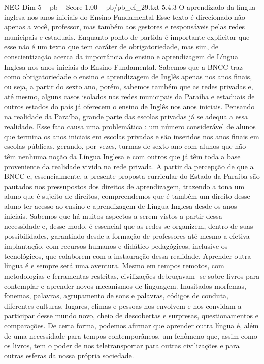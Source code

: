 \begin{textsample}{NEG Dim 5 – pb – Score 1.00 – pb/pb\_ef\_29.txt}  \label{ex:f5_neg_199}
5.4.3 O aprendizado da língua inglesa nos anos iniciais do Ensino Fundamental Esse texto é direcionado não apenas a você, professor, mas também aos gestores e responsáveis pelas redes municipais e estaduais.
Enquanto ponto de partida é importante explicitar que esse não é um texto que tem caráter de obrigatoriedade, mas sim, de conscientização acerca da importância do ensino e aprendizagem de Língua Inglesa nos anos iniciais do Ensino Fundamental.
Sabemos que a BNCC traz como obrigatoriedade o ensino e aprendizagem de Inglês apenas nos anos finais, ou seja, a partir do sexto ano, porém, sabemos também que as redes privadas e, até mesmo, alguns casos isolados nas redes municipais da Paraíba e estaduais de outros estados do país já oferecem o ensino de Inglês nos anos iniciais.
Pensando na realidade da Paraíba, grande parte das escolas privadas já se adequa a essa realidade.
Esse fato causa uma problemática : um número considerável de alunos que termina os anos iniciais em escolas privadas e são inseridos nos anos finais em escolas públicas, gerando, por vezes, turmas de sexto ano com alunos que não têm nenhuma noção da Língua Inglesa e com outros que já têm toda a base proveniente da realidade vivida na rede privada.
A partir da percepção de que a BNCC e, essencialmente, a presente proposta curricular do Estado da Paraíba são pautados nos pressupostos dos direitos de aprendizagem, trazendo a tona um aluno que é sujeito de direitos, compreendemos que é também um direito desse aluno ter acesso ao ensino e aprendizagem de Língua Inglesa desde os anos iniciais.
Sabemos que há muitos aspectos a serem vistos a partir dessa necessidade e, desse modo, é essencial que as redes se organizem, dentro de suas possibilidades, garantindo desde a formação de professores até mesmo a efetiva implantação, com recursos humanos e didático-pedagógicos, inclusive os tecnológicos, que colaborem com a instauração dessa realidade.
Aprender outra língua é e sempre será uma aventura.
Mesmo em tempos remotos, com metodologias e ferramentas restritas, civilizações debruçavam -se sobre livros para contemplar e aprender novos mecanismos de linguagem.
Inusitados morfemas, fonemas, palavras, agrupamento de sons e palavras, códigos de conduta, diferentes culturas, lugares, climas e pessoas nos envolvem e nos convidam a participar desse mundo novo, cheio de descobertas e surpresas, questionamentos e comparações.
De certa forma, podemos afirmar que aprender outra língua é, além de uma necessidade para tempos contemporâneos, um fenômeno que, assim como os livros, tem o poder de nos teletransportar para outras civilizações e para outras esferas da nossa própria sociedade.

\end{textsample}

